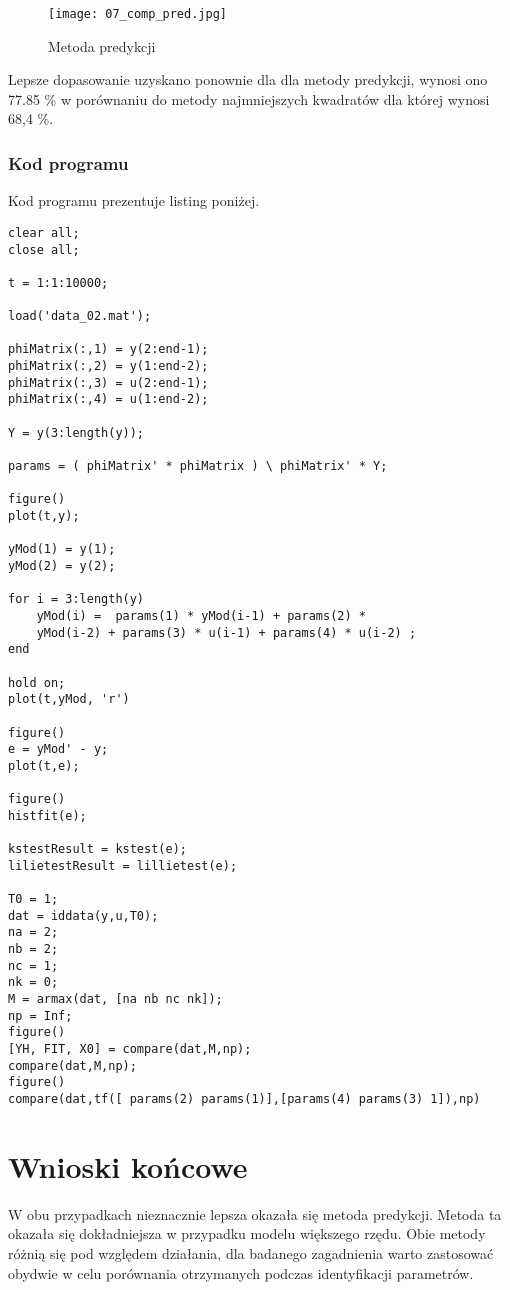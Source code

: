 \documentclass[a4paper,15pt]{article}
\begin{document}
\begin{figure}[H]
\centerline{\texttt{[image: 07\_comp\_pred.jpg]}}
\centering
\caption{Metoda predykcji}
\label{fig:01_kwad_hist}
\end{figure}

Lepsze dopasowanie uzyskano ponownie dla dla metody predykcji, wynosi ono 77.85 \% w porównaniu do metody najmniejszych kwadratów dla której wynosi 68,4 \%. 




\subsubsection{Kod programu}
Kod programu prezentuje listing poniżej.
\begin{lstlisting}[caption=Zadanie 2, captionpos=b,label=lis1, firstnumber=1,frame=single]
clear all;
close all;

t = 1:1:10000;

load('data_02.mat');

phiMatrix(:,1) = y(2:end-1);
phiMatrix(:,2) = y(1:end-2);
phiMatrix(:,3) = u(2:end-1);
phiMatrix(:,4) = u(1:end-2);

Y = y(3:length(y));

params = ( phiMatrix' * phiMatrix ) \ phiMatrix' * Y;

figure()
plot(t,y);

yMod(1) = y(1);
yMod(2) = y(2);

for i = 3:length(y)
    yMod(i) =  params(1) * yMod(i-1) + params(2) * 
    yMod(i-2) + params(3) * u(i-1) + params(4) * u(i-2) ;
end

hold on;
plot(t,yMod, 'r')

figure()
e = yMod' - y;
plot(t,e);

figure()
histfit(e);

kstestResult = kstest(e);
lilietestResult = lillietest(e);

T0 = 1;
dat = iddata(y,u,T0); 
na = 2;
nb = 2;
nc = 1;
nk = 0;
M = armax(dat, [na nb nc nk]);
np = Inf;
figure()
[YH, FIT, X0] = compare(dat,M,np);
compare(dat,M,np);
figure()
compare(dat,tf([ params(2) params(1)],[params(4) params(3) 1]),np) 

\end{lstlisting}



\section{Wnioski końcowe}
W obu przypadkach nieznacznie lepsza okazała się metoda predykcji. Metoda ta okazała się dokładniejsza w przypadku modelu większego rzędu. Obie metody różnią się pod względem działania, dla badanego zagadnienia warto zastosować obydwie w celu porównania otrzymanych podczas identyfikacji parametrów.

 
\end{document}
